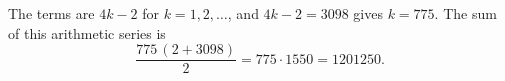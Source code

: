 The terms are $4k-2$ for $k=1,2,\dots$, and $4k-2=3098$ gives $k=775$. The sum of this arithmetic series is
\[
\dfrac{775\,(2+3098)}{2}=775\cdot1550=\boxed{1201250}.
\]
